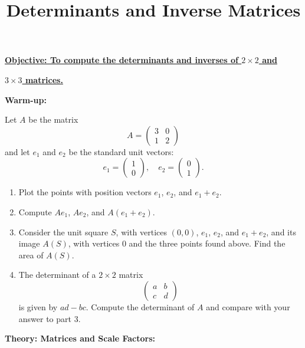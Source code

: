 \documentclass{article}
\begin{document}
\title{Determinants and Inverse Matrices}
\date{}

\maketitle
\thispagestyle{empty}

\Large

\textbf{\underline{Objective: To compute the determinants and inverses of $2\times 2$ and}}

\textbf{\underline{$3\times 3$ matrices.}}






\vspace{5mm}

\textbf{Warm-up:}\bigskip

Let $A$ be the matrix
\[A=\left(\begin{array}{cc} 3 & 0 \\ 1 & 2\end{array}\right)\]
and let $e_1$ and $e_2$ be the standard unit vectors:
\[e_1=\left(\begin{array}{c} 1 \\ 0 \end{array}\right),\quad e_2 = \left(\begin{array}{c} 0 \\ 1 \end{array}\right).\]

\begin{enumerate}
	\item Plot the points with position vectors $e_1$, $e_2$, and $e_1+e_2$.
	\item Compute $Ae_1$, $Ae_2$, and $A(e_1+e_2)$.
	\item Consider the unit square $S$, with vertices $(0,0)$, $e_1$, $e_2$, and $e_1+e_2$, and its image $A(S)$, with vertices $0$ and the three points found above. Find the area of $A(S)$.
	\item The determinant of a $2\times 2$ matrix
		\[\left(\begin{array}{cc}a&b\\c&d\end{array}\right)\]
		is given by $ad-bc$. Compute the determinant of $A$ and compare with your answer to part 3.
\end{enumerate}

\clearpage



\textbf{Theory: Matrices and Scale Factors:}\bigskip
\end{document}
